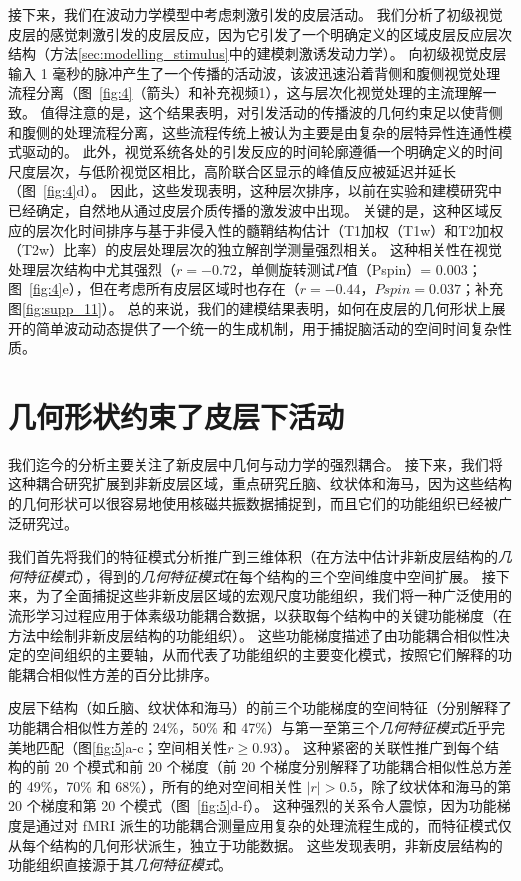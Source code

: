 \documentclass[lang=cn,a4paper,newtx]{elegantpaper}
\begin{document}
接下来，我们在波动力学模型中考虑刺激引发的皮层活动。
我们分析了初级视觉皮层的感觉刺激引发的皮层反应，因为它引发了一个明确定义的区域皮层反应层次结构（方法\ref{sec:modelling_stimulus}中的建模刺激诱发动力学）。
向初级视觉皮层输入 1 毫秒的脉冲产生了一个传播的活动波，该波迅速沿着背侧和腹侧视觉处理流程分离（图~\ref{fig:4}（箭头）和补充视频1），这与层次化视觉处理的主流理解一致。
值得注意的是，这个结果表明，对引发活动的传播波的几何约束足以使背侧和腹侧的处理流程分离，这些流程传统上被认为主要是由复杂的层特异性连通性模式驱动的。
此外，视觉系统各处的引发反应的时间轮廓遵循一个明确定义的时间尺度层次，与低阶视觉区相比，高阶联合区显示的峰值反应被延迟并延长（图~\ref{fig:4}d）。
因此，这些发现表明，这种层次排序，以前在实验和建模研究中已经确定，自然地从通过皮层介质传播的激发波中出现。
关键的是，这种区域反应的层次化时间排序与基于非侵入性的髓鞘结构估计（T1加权（T1w）和T2加权（T2w）比率）的皮层处理层次的独立解剖学测量强烈相关。
这种相关性在视觉处理层次结构中尤其强烈（$ r = -0.72 $，单侧旋转测试$ P $值（Pspin）= 0.003；图~\ref{fig:4}e），但在考虑所有皮层区域时也存在（$ r = -0.44 $，$ Pspin = 0.037 $；补充图\ref{fig:supp_11}）。
总的来说，我们的建模结果表明，如何在皮层的几何形状上展开的简单波动动态提供了一个统一的生成机制，用于捕捉脑活动的空间时间复杂性质。



\section{几何形状约束了皮层下活动}

我们迄今的分析主要关注了新皮层中几何与动力学的强烈耦合。
接下来，我们将这种耦合研究扩展到非新皮层区域，重点研究丘脑、纹状体和海马，因为这些结构的几何形状可以很容易地使用核磁共振数据捕捉到，而且它们的功能组织已经被广泛研究过。


我们首先将我们的特征模式分析推广到三维体积（在方法中估计非新皮层结构的\textit{几何特征模式}），得到的\textit{几何特征模式}在每个结构的三个空间维度中空间扩展。
接下来，为了全面捕捉这些非新皮层区域的宏观尺度功能组织，我们将一种广泛使用的流形学习过程应用于体素级功能耦合数据，以获取每个结构中的关键功能梯度（在方法中绘制非新皮层结构的功能组织）。
这些功能梯度描述了由功能耦合相似性决定的空间组织的主要轴，从而代表了功能组织的主要变化模式，按照它们解释的功能耦合相似性方差的百分比排序。


皮层下结构（如丘脑、纹状体和海马）的前三个功能梯度的空间特征（分别解释了功能耦合相似性方差的 24\%，50\% 和 47\%）与第一至第三个\textit{几何特征模式}近乎完美地匹配（图\ref{fig:5}a-c；空间相关性$ r\geq0.93 $）。
这种紧密的关联性推广到每个结构的前 20 个模式和前 20 个梯度（前 20 个梯度分别解释了功能耦合相似性总方差的 49\%，70\% 和 68\%），所有的绝对空间相关性 $ |r| > 0.5 $，除了纹状体和海马的第 20 个梯度和第 20 个模式（图~\ref{fig:5}d-f）。
这种强烈的关系令人震惊，因为功能梯度是通过对 fMRI 派生的功能耦合测量应用复杂的处理流程生成的，而特征模式仅从每个结构的几何形状派生，独立于功能数据。
这些发现表明，非新皮层结构的功能组织直接源于其\textit{几何特征模式}。
\end{document}

